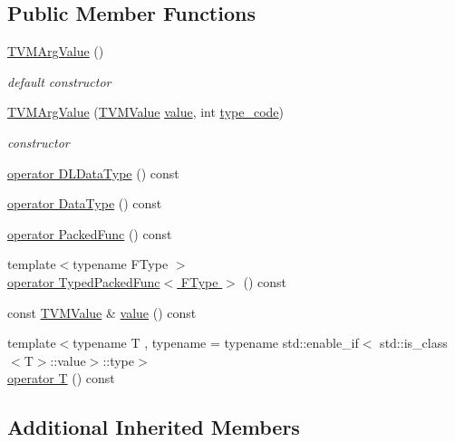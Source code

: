 \subsection*{Public Member Functions}
\begin{DoxyCompactItemize}
\item 
\hyperlink{classtvm_1_1runtime_1_1TVMArgValue_a987b2fb283cea5484d4655e3f711c046}{T\+V\+M\+Arg\+Value} ()
\begin{DoxyCompactList}\small\item\em default constructor \end{DoxyCompactList}\item 
\hyperlink{classtvm_1_1runtime_1_1TVMArgValue_a5fbd71750e5bbba6edc9094178af9276}{T\+V\+M\+Arg\+Value} (\hyperlink{unionTVMValue}{T\+V\+M\+Value} \hyperlink{classtvm_1_1runtime_1_1TVMArgValue_abb35e686e66c7af341584ba78a956270}{value}, int \hyperlink{classtvm_1_1runtime_1_1TVMPODValue___a5a799e4197f227549cd641b0e753f9b8}{type\+\_\+code})
\begin{DoxyCompactList}\small\item\em constructor \end{DoxyCompactList}\item 
\hyperlink{classtvm_1_1runtime_1_1TVMArgValue_a42023de967d37a0ff1a6dd0b6cdf9660}{operator D\+L\+Data\+Type} () const 
\item 
\hyperlink{classtvm_1_1runtime_1_1TVMArgValue_a07ea2b6deccadcc2a49597cfc241c278}{operator Data\+Type} () const 
\item 
\hyperlink{classtvm_1_1runtime_1_1TVMArgValue_abffc8b37686cc5e79f5029b1a86e04eb}{operator Packed\+Func} () const 
\item 
{\footnotesize template$<$typename F\+Type $>$ }\\\hyperlink{classtvm_1_1runtime_1_1TVMArgValue_a3248024ad6150cac8911c60259c3ffbd}{operator Typed\+Packed\+Func$<$ F\+Type $>$} () const 
\item 
const \hyperlink{unionTVMValue}{T\+V\+M\+Value} \& \hyperlink{classtvm_1_1runtime_1_1TVMArgValue_abb35e686e66c7af341584ba78a956270}{value} () const 
\item 
{\footnotesize template$<$typename T , typename  = typename std\+::enable\+\_\+if$<$             std\+::is\+\_\+class$<$\+T$>$\+::value$>$\+::type$>$ }\\\hyperlink{classtvm_1_1runtime_1_1TVMArgValue_a1621744e7148fee07fdc623e25961000}{operator T} () const 
\end{DoxyCompactItemize}
\subsection*{Additional Inherited Members}


